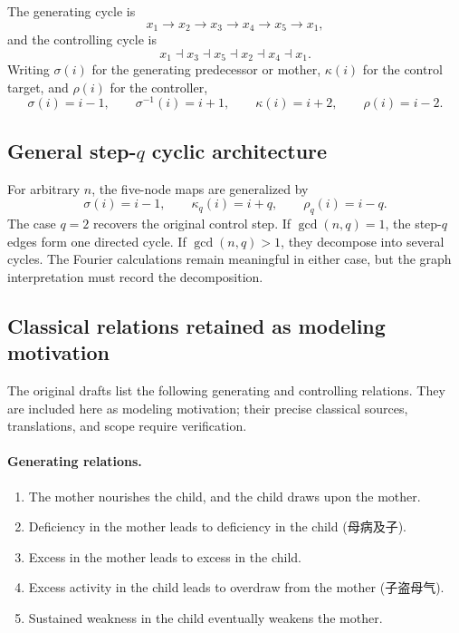 \documentclass[11pt, reqno]{amsart}
\theoremstyle{definition}
\theoremstyle{remark}
\begin{document}
The generating cycle is
\[
    x_1\longrightarrow x_2\longrightarrow x_3\longrightarrow x_4
    \longrightarrow x_5\longrightarrow x_1,
\]
and the controlling cycle is
\[
    x_1\dashv x_3\dashv x_5\dashv x_2\dashv x_4\dashv x_1.
\]
Writing $\sigma(i)$ for the generating predecessor or mother,
$\kappa(i)$ for the control target, and $\rho(i)$ for the controller,
\begin{equation}
\label{eq:five-maps}
    \sigma(i)=i-1,
    \qquad
    \sigma^{-1}(i)=i+1,
    \qquad
    \kappa(i)=i+2,
    \qquad
    \rho(i)=i-2.
\end{equation}

\subsection{General step-$q$ cyclic architecture}

For arbitrary $n$, the five-node maps are generalized by
\[
    \sigma(i)=i-1,
    \qquad
    \kappa_q(i)=i+q,
    \qquad
    \rho_q(i)=i-q.
\]
The case $q=2$ recovers the original control step.  If $\gcd(n,q)=1$, the
step-$q$ edges form one directed cycle.  If $\gcd(n,q)>1$, they decompose into
several cycles.  The Fourier calculations remain meaningful in either case,
but the graph interpretation must record the decomposition.

\subsection{Classical relations retained as modeling motivation}

The original drafts list the following generating and controlling relations.
They are included here as modeling motivation; their precise classical sources,
translations, and scope require verification.

\paragraph{Generating relations.}
\begin{enumerate}[label=\arabic*.,leftmargin=2.5em]
    \item The mother nourishes the child, and the child draws upon the mother.
    \item Deficiency in the mother leads to deficiency in the child
    (母病及子).
    \item Excess in the mother leads to excess in the child.
    \item Excess activity in the child leads to overdraw from the mother
    (子盗母气).
    \item Sustained weakness in the child eventually weakens the mother.
\end{enumerate}
\end{document}
